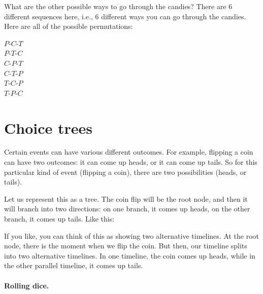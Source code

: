 \documentclass[../../../main.tex]{subfiles}
\begin{document}
What are the other possible ways to go through the candies? There are 6 different sequences here, i.e., 6 different ways you can go through the candies. Here are all of the possible permutations:

\begin{center}
  $P$-$C$-$T$ \\
  $P$-$T$-$C$ \\
  $C$-$P$-$T$ \\
  $C$-$T$-$P$ \\
  $T$-$C$-$P$ \\
  $T$-$P$-$C$
\end{center}


\section{Choice trees}

Certain events can have various different outcomes. For example, flipping a coin can have two outcomes: it can come up heads, or it can come up tails. So for this particular kind of event (flipping a coin), there are two possibilities (heads, or tails).

Let us represent this as a tree. The coin flip will be the root node, and then it will branch into two directions: on one branch, it comes up heads, on the other branch, it comes up tails. Like this:

\begin{center}
\end{center}

\noindent
If you like, you can think of this as showing two alternative timelines. At the root node, there is the moment when we flip the coin. But then, our timeline splits into two alternative timelines. In one timeline, the coin comes up heads, while in the other parallel timeline, it comes up tails. 

\paragraph{Rolling dice.}
\end{document}

